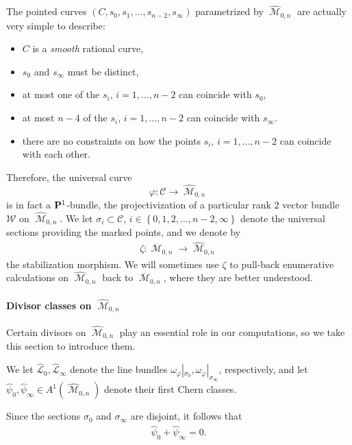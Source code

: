 \documentclass[12pt,reqno]{amsart}
\DeclareMathOperator{\M}{\mathcal{M}}
\renewcommand{\to}{{\longrightarrow}}
\numberwithin{equation}{section}
\newcommand{\cC}{\mathcal{C}}
\newcommand{\hL}{\widehat{\mathcal{L}}}
\newcommand{\hpsi}{\widehat{\psi}}
\newcommand{\hM}{\widehat{\M}}
\begin{document}
The pointed curves $(C, s_{0}, s_{1}, \dots, s_{n-2}, s_{\infty})$
parametrized by $\hM_{0,n}$ are actually very simple to describe:

\begin{itemize}
\item $C$ is a {\sl smooth} rational curve,
\item $s_{0}$ and $s_{\infty}$ must be distinct,
\item at most one of the $s_{i}$, $i=1, \dots, n-2$ can coincide with
  $s_{0}$,
\item at most $n-4$ of the $s_{i}$, $i=1, \dots, n-2$ can coincide
  with $s_{\infty}$.
\item there are no constraints on how the points $s_{i}$,
  $i=1, \dots, n-2$ can coincide with each other.
\end{itemize}
Therefore, the universal curve $$\varphi: \cC \to \hM_{0,n}$$ is in
fact a $\P^{1}$-bundle, the projectivization of a particular rank $2$
vector bundle $\mathcal{W}$ on $\hM_{0,n}$. We let
$\sigma_{i} \subset \cC$,
$i \in \left\{0,1,2, \dots, n-2, \infty\right\}$ denote the universal
sections providing the marked points, and we denote by
\begin{align}
  \label{eq:stab}
  \zeta: \overline{\M}_{0,n} \to \hM_{0,n}
\end{align}
the stabilization morphism.  We will sometimes use $\zeta$ to
pull-back enumerative calculations on $\hM_{0,n}$ back to
$\overline{\M}_{0,n}$, where they are better understood.

\paragraph{Divisor classes on $\hM_{0,n}$}
\label{sec:divisor-classes-hm_0}

Certain divisors on $\hM_{0,n}$  play an essential role in our
computations, so we take this section to introduce them.

\begin{definition}
  \label{def:psihats} We let $\hL_{0}, \hL_{\infty}$ denote the line
  bundles
  $\omega_{\varphi}|_{\sigma_{0}},
  \omega_{\varphi}|_{\sigma_{\infty}}$, respectively, and let
  $\hpsi_{0}, \hpsi_{\infty} \in A^{1}(\hM_{0,n})$ denote their first
  Chern classes.
\end{definition}

Since the sections $\sigma_{0}$ and $\sigma_{\infty}$ are disjoint, it
follows that
\begin{align}
  \label{eq:opposites}
  \hpsi_{0} + \hpsi_{\infty} = 0.
\end{align}
\end{document}

